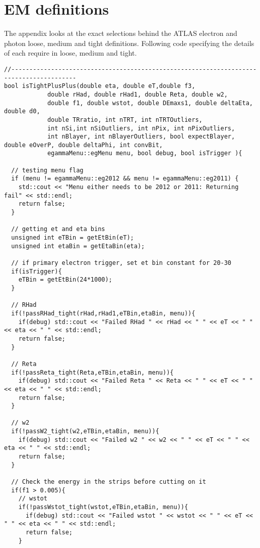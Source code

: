 \chapter{EM definitions}

The appendix looks at the exact selections behind the ATLAS electron and photon loose, medium and tight definitions. Following code specifying the details of each require in loose, medium and tight.



\begin{lstlisting}
//----------------------------------------------------------------------------------------
bool isTightPlusPlus(double eta, double eT,double f3,
			double rHad, double rHad1, double Reta, double w2, 
			double f1, double wstot, double DEmaxs1, double deltaEta, double d0,
			double TRratio, int nTRT, int nTRTOutliers,
			int nSi,int nSiOutliers, int nPix, int nPixOutliers, 
			int nBlayer, int nBlayerOutliers, bool expectBlayer, double eOverP, double deltaPhi, int convBit,
			egammaMenu::egMenu menu, bool debug, bool isTrigger ){
	
  // testing menu flag
  if (menu != egammaMenu::eg2012 && menu != egammaMenu::eg2011) {
    std::cout << "Menu either needs to be 2012 or 2011: Returning fail" << std::endl;
    return false; 
  }

  // getting et and eta bins  
  unsigned int eTBin = getEtBin(eT);
  unsigned int etaBin = getEtaBin(eta);

  // if primary electron trigger, set et bin constant for 20-30 
  if(isTrigger){
    eTBin = getEtBin(24*1000);
  }
  
  // RHad
  if(!passRHad_tight(rHad,rHad1,eTBin,etaBin, menu)){
    if(debug) std::cout << "Failed RHad " << rHad << " " << eT << " " << eta << " " << std::endl;
    return false;
  }

  // Reta 
  if(!passReta_tight(Reta,eTBin,etaBin, menu)){
    if(debug) std::cout << "Failed Reta " << Reta << " " << eT << " " << eta << " " << std::endl;
    return false;
  }

  // w2
  if(!passW2_tight(w2,eTBin,etaBin, menu)){
    if(debug) std::cout << "Failed w2 " << w2 << " " << eT << " " << eta << " " << std::endl;
    return false;
  }

  // Check the energy in the strips before cutting on it
  if(f1 > 0.005){
    // wstot
    if(!passWstot_tight(wstot,eTBin,etaBin, menu)){
      if(debug) std::cout << "Failed wstot " << wstot << " " << eT << " " << eta << " " << std::endl;
      return false;
    }
  

\end{lstlisting}
